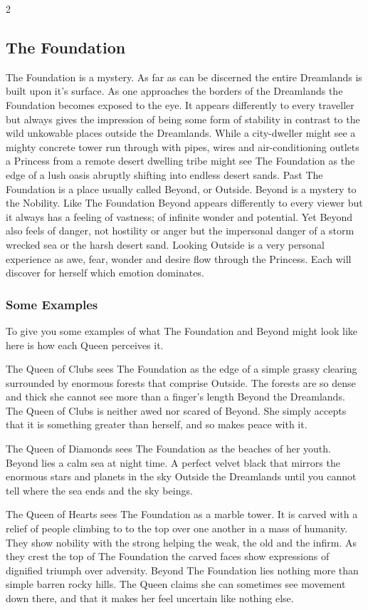 \begin{multicols}{2}
\subsection*{The Foundation}
The Foundation is a mystery. As far as can be discerned the entire Dreamlands is built upon it's surface. As one approaches the borders of the Dreamlands the Foundation becomes exposed to the eye. It appears differently to every traveller but always gives the impression of being some form of stability in contrast to the wild unkowable places outside the Dreamlands. While a city-dweller might see a mighty concrete tower run through with pipes, wires and air-conditioning outlets a Princess from a remote desert dwelling tribe might see The Foundation as the edge of a lush oasis abruptly shifting into endless desert sands. Past The Foundation is a place usually called Beyond, or Outside. Beyond is a mystery to the Nobility. Like The Foundation Beyond appears differently to every viewer but it always has a feeling of vastness; of infinite wonder and potential. Yet Beyond also feels of danger, not hostility or anger but the impersonal danger of a storm wrecked sea or the harsh desert sand. Looking Outside is a 
very personal experience as awe, fear, wonder and desire flow through the Princess. Each will discover for herself which emotion dominates. 

\bigsidebarstart

\subsubsection*{Some Examples}

To give you some examples of what The Foundation and Beyond might look like here is how each Queen perceives it.

The Queen of Clubs sees The Foundation as the edge of a simple grassy clearing surrounded by enormous forests that comprise Outside. The forests are so dense and thick she cannot see more than a finger's length Beyond the Dreamlands. The Queen of Clubs is neither awed nor scared of Beyond. She simply accepts that it is something greater than herself, and so makes peace with it.

The Queen of Diamonds sees The Foundation as the beaches of her youth. Beyond lies a calm sea at night time. A perfect velvet black that mirrors the enormous stars and planets in the sky Outside the Dreamlands until you cannot tell where the sea ends and the sky beings.

The Queen of Hearts sees The Foundation as a marble tower. It is carved with a relief of people climbing to to the top over one another in a mass of humanity. They show nobility with the strong helping the weak, the old and the infirm. As they crest the top of The Foundation the carved faces show expressions of dignified triumph over adversity. Beyond The Foundation lies nothing more than simple barren rocky hills. The Queen claims she can sometimes see movement down there, and that it makes her feel uncertain like nothing else.


\end{multicols}
